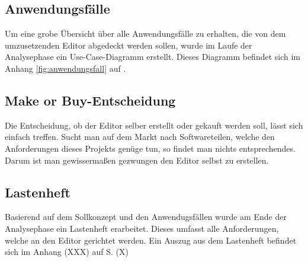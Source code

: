 \subsection{Anwendungsfälle}

Um eine grobe Übersicht über alle Anwendungsfälle zu erhalten, die von dem umzusetzenden Editor
abgedeckt werden sollen, wurde im Laufe der Analysephase ein Use-Case-Diagramm erstellt. Dieses
Diagramm befindet sich im Anhang \autoref{fig:anwendungsfall} auf .

\subsection{\glqq Make or Buy\grqq -Entscheidung}
Die Entscheidung, ob der Editor selber erstellt oder gekauft werden soll, lässt sich einfach treffen. Sucht man auf dem Markt nach Softwareteilen, welche den Anforderungen dieses Projekts genüge tun, so findet man nichts entsprechendes. Darum ist man gewissermaßen gezwungen den Editor selbst zu erstellen.

\subsection{Lastenheft}

Basierend auf dem Sollkonzept und den Anwendugsfällen wurde am Ende der Analysephase ein Lastenheft erarbeitet. Dieses umfasst alle Anforderungen, welche an den Editor gerichtet werden. Ein Auszug aus dem Lastenheft befindet sich im Anhang (XXX) auf S. (X)

\newpage
